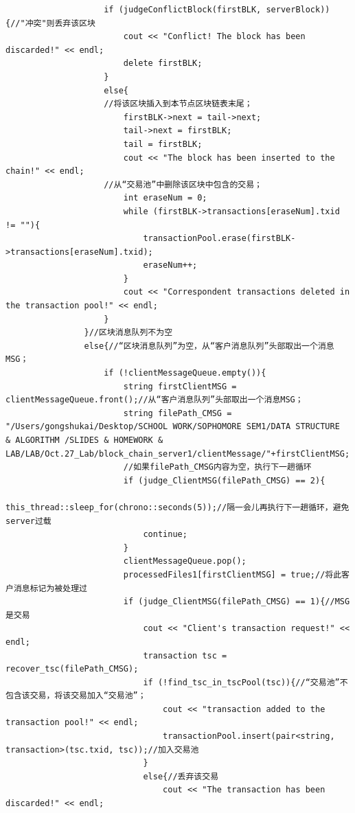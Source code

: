 \documentclass[10pt,a4paper]{article}
\begin{document}
\begin{verbatim}
                    if (judgeConflictBlock(firstBLK, serverBlock)){//"冲突"则丢弃该区块
                        cout << "Conflict! The block has been discarded!" << endl;
                        delete firstBLK;
                    }
                    else{
                    //将该区块插入到本节点区块链表末尾；
                        firstBLK->next = tail->next;
                        tail->next = firstBLK;
                        tail = firstBLK;
                        cout << "The block has been inserted to the chain!" << endl;
                    //从“交易池”中删除该区块中包含的交易；
                        int eraseNum = 0;
                        while (firstBLK->transactions[eraseNum].txid != ""){
                            transactionPool.erase(firstBLK->transactions[eraseNum].txid);
                            eraseNum++;
                        }
                        cout << "Correspondent transactions deleted in the transaction pool!" << endl;
                    }
                }//区块消息队列不为空
                else{//“区块消息队列”为空，从“客户消息队列”头部取出一个消息MSG；
                    if (!clientMessageQueue.empty()){
                        string firstClientMSG = clientMessageQueue.front();//从“客户消息队列”头部取出一个消息MSG；
                        string filePath_CMSG = "/Users/gongshukai/Desktop/SCHOOL WORK/SOPHOMORE SEM1/DATA STRUCTURE  & ALGORITHM /SLIDES & HOMEWORK & LAB/LAB/Oct.27_Lab/block_chain_server1/clientMessage/"+firstClientMSG;
                        //如果filePath_CMSG内容为空，执行下一趟循环
                        if (judge_ClientMSG(filePath_CMSG) == 2){
                            this_thread::sleep_for(chrono::seconds(5));//隔一会儿再执行下一趟循环，避免server过载
                            continue;
                        }
                        clientMessageQueue.pop();
                        processedFiles1[firstClientMSG] = true;//将此客户消息标记为被处理过
                        if (judge_ClientMSG(filePath_CMSG) == 1){//MSG 是交易
                            cout << "Client's transaction request!" << endl;
                            transaction tsc = recover_tsc(filePath_CMSG);
                            if (!find_tsc_in_tscPool(tsc)){//“交易池”不包含该交易，将该交易加入“交易池”；
                                cout << "transaction added to the transaction pool!" << endl;
                                transactionPool.insert(pair<string, transaction>(tsc.txid, tsc));//加入交易池
                            }
                            else{//丢弃该交易
                                cout << "The transaction has been discarded!" << endl;

\end{verbatim}
\end{document}

